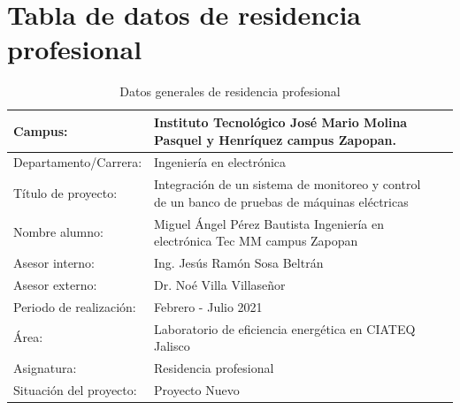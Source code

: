 \documentclass[12pt,titlepage]{article}
\begin{document}
\section{Tabla de datos de residencia profesional}
\begin{table}[!h]

\begin{center}
\begin{tabular}{ | m{15em} | m{22em}| m{35em} | } 
\hline
Campus: & \vspace{5mm} Instituto Tecnológico José Mario Molina Pasquel y Henríquez campus Zapopan.  \\[3.5mm]
\hline
Departamento/Carrera: & \vspace{5mm} Ingeniería en electrónica  \\ [3.5mm]
\hline
Título de proyecto: & \vspace{5mm} Integración de un sistema de monitoreo y control de un banco de pruebas de máquinas eléctricas \\[2.5mm]
\hline
Nombre alumno: & \vspace{5mm} Miguel Ángel Pérez Bautista \newline 16011804 \newline Ingeniería en electrónica \newline Tec MM campus Zapopan \\ [3.5mm]
\hline
Asesor interno: & \vspace{5mm} Ing. Jesús Ramón Sosa Beltrán \newline   \\ [3.5mm]
\hline
Asesor externo: & \vspace{5mm} Dr. Noé Villa Villaseñor  \\ [3.5mm]
\hline
Periodo de realización: & \vspace{5mm} Febrero  - Julio 2021  \\  [3.5mm]
\hline
Área: & \vspace{5mm} Laboratorio de eficiencia energética en CIATEQ Jalisco  \\  [3.5mm]
\hline
Asignatura: & \vspace{5mm} Residencia profesional  \\  [3.5mm]
\hline
Situación del proyecto: & \vspace{5mm}  Proyecto Nuevo  \\  [3.5mm]
\hline
\end{tabular}
\end{center}
\caption{Datos generales de residencia profesional}
\label{tabla:1}
\end{table}
\newpage
\end{document}
